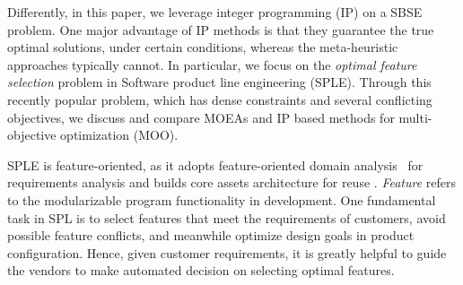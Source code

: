 
Differently, in this paper, we leverage integer programming (IP) on a SBSE problem. One major advantage of IP methods is that they guarantee the true optimal solutions, under certain conditions, whereas the meta-heuristic approaches typically cannot. In particular, we focus on the \emph{optimal feature selection} problem in Software product line engineering (SPLE). Through this recently popular problem, which has dense constraints and several conflicting objectives, we discuss and compare MOEAs and IP based methods for  multi-objective optimization (MOO).



SPLE is feature-oriented, as it adopts feature-oriented domain analysis~\cite{tr:foda} for requirements analysis and builds core assets architecture for reuse \cite{Clements01}. \emph{Feature} refers to the modularizable program functionality in development.
One fundamental task in SPL is to select features that meet the requirements of customers, avoid possible feature conflicts, and meanwhile optimize design goals in product configuration. Hence, given customer requirements, it is greatly helpful to guide the vendors to make automated decision on selecting optimal features. %


